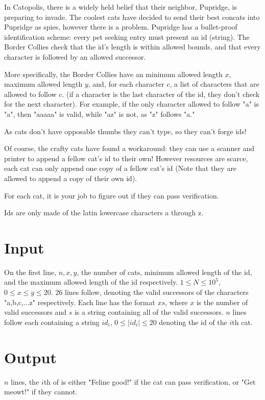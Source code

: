 
In Catopolis, there is a widely held belief that their neighbor, Pupridge, is preparing to invade. The coolest cats have decided to send their best concats into Pupridge as spies, however there is a problem. Pupridge has a bullet-proof identification scheme: every pet seeking entry must present an id (string). The Border Collies check that the id's length is within allowed bounds, and that every character is followed by an allowed successor. 

More specifically, the Border Collies have an minimum allowed length $x$, maximum allowed length $y$, and, for each character $c$, a list of characters that are allowed to follow $c$. (if a character is the last character of the id, they don't check for the next character). For example, if the only character allowed to follow "a" is "a", then "aaaaa" is valid, while "az" is not, as "z" follows "a."

As cats don't have opposable thumbs they can't type, so they can't forge ids!

\medskip

Of course, the crafty cats have found a workaround: they can use a scanner and printer to append a fellow cat's id to their own! However resources are scarce, each cat can only append one copy of a fellow cat's id (Note that they are allowed to append a copy of their own id).

\medskip

For each cat, it is your job to figure out if they can pass verification.

Ids are only made of the latin lowercase characters a through z.

\section*{Input}
On the first line, $n, x, y$, the number of cats, minimum allowed length of the id, and the maximum allowed length of the id respectively. $1 \leq N \leq 10^5$, $0 \leq x \leq y \leq 20$.
26 lines follow, denoting the valid successors of the characters "a,b,c,...z" respectively. Each line has the format $x s$, where $x$ is the number of valid successors and $s$ is a string containing all of the valid successors.
$n$ lines follow each containing a string $id_i$, $0 \leq |id_i| \leq 20$ denoting the id of the $i$th cat.

\section*{Output}
$n$ lines, the $i$th of is either "Feline good!" if the cat can pass verification, or "Get meowt!" if they cannot.
